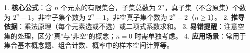 \begin{summarybox}
1. \textbf{核心公式}：含 $n$ 个元素的有限集合，子集总数为 $2^n$，真子集（不含原集）个数为 $2^n-1$，非空子集个数为 $2^n-1$，非空真子集个数为 $2^n-2$（$n\geqslant 1$）。
2. \textbf{推导依据}：乘法原理（每个元素选或不选）或二项式系数求和。
3. \textbf{易错提醒}：注意空集的处理，区分"真"与"非空"的概念；$n=0$ 时需单独考虑。
4. \textbf{应用场景}：常用于集合基本概念题、组合计数、概率中的样本空间计算等。
\end{summarybox}